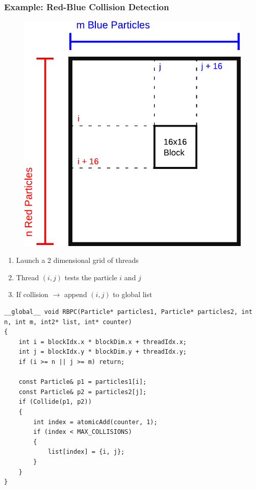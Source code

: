 \documentclass[aspectratio=169,handout]{beamer}
\begin{document}
\begin{frame}[fragile]
\frametitle{Example: Red-Blue Collision Detection}
\begin{minipage}{0.4\linewidth}
	\vspace{0.3cm}
		\begin{figure}
	\includegraphics[height=0.7\textheight]{red_blue_particles2}
\end{figure}
\end{minipage}
\begin{minipage}{0.57\linewidth}
\begin{enumerate}
	\item Launch a 2 dimensional grid of threads
	\item Thread $(i,j)$ tests the particle $i$ and $j$
	\item If collision $\rightarrow$ append $(i,j)$ to global list
\end{enumerate}
\end{minipage}
\end{frame}

\begin{frame}[fragile]
\begin{lstlisting}
__global__ void RBPC(Particle* particles1, Particle* particles2, int n, int m, int2* list, int* counter)
{
    int i = blockIdx.x * blockDim.x + threadIdx.x;
    int j = blockIdx.y * blockDim.y + threadIdx.y;
    if (i >= n || j >= m) return;

    const Particle& p1 = particles1[i];
    const Particle& p2 = particles2[j];
    if (Collide(p1, p2))
    {
        int index = atomicAdd(counter, 1);
        if (index < MAX_COLLISIONS)
        {
            list[index] = {i, j};
        }
    }
}
\end{lstlisting}
\end{frame}
\end{document}
